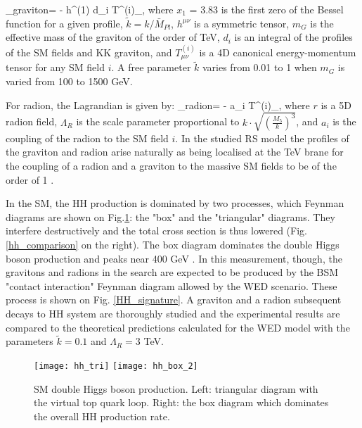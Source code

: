 \beqn\label{lagr_graviton}
\Lagr_{graviton}=  -  h^{\mu\nu(1)} \times d_i T^{(i)}_{\mu\nu},  
\eeqn
where $x_1$ = 3.83 is the first zero of the Bessel function for a given profile, $\tilde{k}  = k / \bar{M}_{Pl}$, $h^{\mu\nu}$ is a symmetric tensor, $m_G$ is the effective mass of the graviton of the order of TeV, $d_i$ is an integral of the profiles of the SM fields and KK graviton, and  $T^{(i)}_{\mu\nu}$ is a 4D canonical energy-momentum tensor \cite{Forger:2003ut} for any SM field $i$. A free parameter $\tilde{k}$ varies from 0.01 to 1 when $m_{G}$ is varied from 100 to 1500 GeV. 

For radion, the Lagrandian is given by:
\beqn\label{lagr_radion}
\Lagr_{radion}=  -  \times a_i T^{\mu (i)}_{\mu},  
\eeqn
where $r$ is a 5D radion field, $\Lambda_R$ is the scale parameter proportional to $k \cdot \sqrt{ ( \frac{M_5}{k} )^3}$, and $a_i$ is the coupling of the radion to the SM field $i$. In the studied RS model the profiles of the graviton and radion arise naturally as being localised at the TeV brane for the coupling of a radion and a graviton to the massive SM fields to be of the order of 1 \cite{WED}. 


In the SM, the HH production is dominated by two processes, which Feynman diagrams are shown on Fig.\ref{SM_HH}: the "box" and the "triangular" diagrams. They interfere destructively and the total cross section is thus lowered (Fig. \ref{hh_comparison} on the right). The box diagram dominates the double Higgs boson production and peaks near 400 GeV \cite{Chen:2014xra}. In this measurement, though, the gravitons and radions in the search are expected to be produced by the BSM "contact interaction" Feynman diagram allowed by the WED scenario. These process is shown on Fig. \ref{HH_signature}.  A graviton and a radion subsequent decays to HH system are thoroughly studied and the experimental results are compared to the theoretical predictions calculated for the WED model with the parameters $\tilde{k}=0.1$ and $\Lambda_R = 3 $ TeV.  


\begin{figure}[H]
  \centering
    \texttt{[image: hh\_tri]}
     \texttt{[image: hh\_box\_2]}
    \caption[SM double Higgs boson production]{SM double Higgs boson production. Left: triangular diagram with the virtual top quark loop. Right: the box diagram which dominates the overall HH production rate.}
    \label{SM_HH}
\end{figure}

